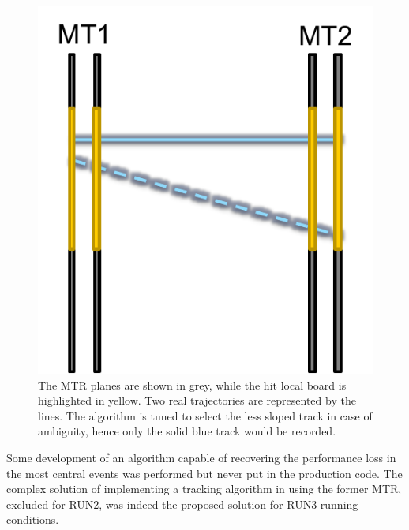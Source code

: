 \begin{figure}[!ht]
\begin{center}
\includegraphics[width=0.5\linewidth]{Chapters/O2/Figs/MTR_old.pdf}
\caption{The MTR planes are shown in grey, while the hit local board is highlighted in yellow. Two real trajectories are represented by the lines. The algorithm is tuned to select the less sloped track in case of ambiguity, hence only the solid blue track would be recorded.}
\label{fig:MTR_loss}
\end{center}
\end{figure}

Some development of an algorithm capable of recovering the performance loss in the most central events was performed but never put in the production code.
The complex solution of implementing a tracking algorithm in using the former MTR, excluded for RUN2, was indeed the proposed solution for RUN3 running conditions.

